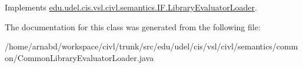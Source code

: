 Implements \hyperlink{interfaceedu_1_1udel_1_1cis_1_1vsl_1_1civl_1_1semantics_1_1IF_1_1LibraryEvaluatorLoader_a8f44b595a82b95ef30d174fb725a1f7a}{edu.\+udel.\+cis.\+vsl.\+civl.\+semantics.\+I\+F.\+Library\+Evaluator\+Loader}.



The documentation for this class was generated from the following file\+:\begin{DoxyCompactItemize}
\item 
/home/arnabd/workspace/civl/trunk/src/edu/udel/cis/vsl/civl/semantics/common/Common\+Library\+Evaluator\+Loader.\+java\end{DoxyCompactItemize}
